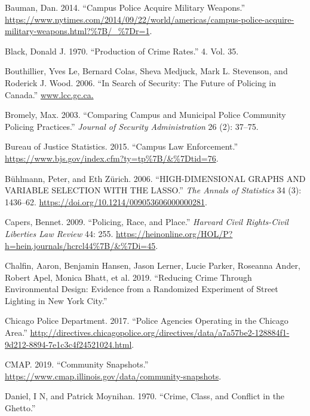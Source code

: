 \documentclass{ucetd}
\begin{document}
\leavevmode\hypertarget{ref-Bauman2014}{}%
Bauman, Dan. 2014. ``Campus Police Acquire Military Weapons.''
\url{https://www.nytimes.com/2014/09/22/world/americas/campus-police-acquire-military-weapons.html?\%7B/_\%7Dr=1}.

\leavevmode\hypertarget{ref-Black1970}{}%
Black, Donald J. 1970. ``Production of Crime Rates.'' 4. Vol. 35.

\leavevmode\hypertarget{ref-Bouthillier2006}{}%
Bouthillier, Yves Le, Bernard Colas, Sheva Medjuck, Mark L. Stevenson,
and Roderick J. Wood. 2006. ``In Search of Security: The Future of
Policing in Canada.'' \url{www.lcc.gc.ca.}

\leavevmode\hypertarget{ref-Bromley2003}{}%
Bromely, Max. 2003. ``Comparing Campus and Municipal Police Community
Policing Practices.'' \emph{Journal of Security Administration} 26 (2):
37--75.

\leavevmode\hypertarget{ref-BureauofJusticeStatistics2015}{}%
Bureau of Justice Statistics. 2015. ``Campus Law Enforcement.''
\url{https://www.bjs.gov/index.cfm?ty=tp\%7B/\&\%7Dtid=76}.

\leavevmode\hypertarget{ref-Buhlmann2006}{}%
Bühlmann, Peter, and Eth Zürich. 2006. ``HIGH-DIMENSIONAL GRAPHS AND
VARIABLE SELECTION WITH THE LASSO.'' \emph{The Annals of Statistics} 34
(3): 1436--62. \url{https://doi.org/10.1214/009053606000000281}.

\leavevmode\hypertarget{ref-Capers2009}{}%
Capers, Bennet. 2009. ``Policing, Race, and Place.'' \emph{Harvard Civil
Rights-Civil Liberties Law Review} 44: 255.
\url{https://heinonline.org/HOL/P?h=hein.journals/hcrcl44\%7B/\&\%7Di=45}.

\leavevmode\hypertarget{ref-Chalfin2019}{}%
Chalfin, Aaron, Benjamin Hansen, Jason Lerner, Lucie Parker, Roseanna
Ander, Robert Apel, Monica Bhatt, et al. 2019. ``Reducing Crime Through
Environmental Design: Evidence from a Randomized Experiment of Street
Lighting in New York City.''

\leavevmode\hypertarget{ref-ChicagoPoliceDepartment2017}{}%
Chicago Police Department. 2017. ``Police Agencies Operating in the
Chicago Area.''
\url{http://directives.chicagopolice.org/directives/data/a7a57be2-128884f1-9d212-8894-7e1c3c4f24521024.html}.

\leavevmode\hypertarget{ref-CMAP2019}{}%
CMAP. 2019. ``Community Snapshots.''
\url{https://www.cmap.illinois.gov/data/community-snapshots}.

\leavevmode\hypertarget{ref-Daniel1970}{}%
Daniel, I N, and Patrick Moynihan. 1970. ``Crime, Class, and Conflict in
the Ghetto.''
\end{document}
